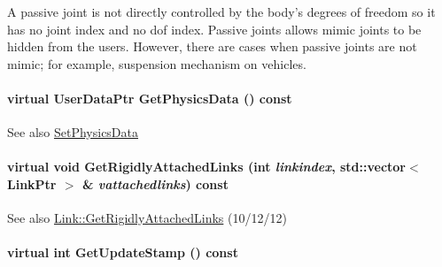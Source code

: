 A passive joint is not directly controlled by the body's degrees of freedom so it has no joint index and no dof index. Passive joints allows mimic joints to be hidden from the users. However, there are cases when passive joints are not mimic; for example, suspension mechanism on vehicles. \hypertarget{classOpenRAVE_1_1KinBody_abeee587581232f14ea57e9f05b740779}{
\paragraph[{GetPhysicsData}]{\setlength{\rightskip}{0pt plus 5cm}virtual UserDataPtr GetPhysicsData () const}\hfill}
\label{classOpenRAVE_1_1KinBody_abeee587581232f14ea57e9f05b740779}
\begin{DoxySeeAlso}{See also}
\hyperlink{classOpenRAVE_1_1KinBody_aa282fd034535ec4b05f90f9cd32bd1c9}{SetPhysicsData} 
\end{DoxySeeAlso}
\hypertarget{classOpenRAVE_1_1KinBody_a2fc883be19068452aa218bf252c244b1}{
\paragraph[{GetRigidlyAttachedLinks}]{\setlength{\rightskip}{0pt plus 5cm}virtual void GetRigidlyAttachedLinks (int {\em linkindex}, \/  std::vector$<$ LinkPtr $>$ \& {\em vattachedlinks}) const}\hfill}
\label{classOpenRAVE_1_1KinBody_a2fc883be19068452aa218bf252c244b1}
\begin{DoxySeeAlso}{See also}
\hyperlink{classOpenRAVE_1_1KinBody_1_1Link_a1452271a9a62d59785c04764543f94d7}{Link::GetRigidlyAttachedLinks} (10/12/12) 
\end{DoxySeeAlso}
\hypertarget{classOpenRAVE_1_1KinBody_aac16fee68aa354fa24e6de5b8f79b78d}{
\paragraph[{GetUpdateStamp}]{\setlength{\rightskip}{0pt plus 5cm}virtual int GetUpdateStamp () const}\hfill}
\label{classOpenRAVE_1_1KinBody_aac16fee68aa354fa24e6de5b8f79b78d}


